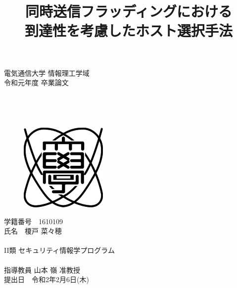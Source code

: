 \title{ 同時送信フラッディングにおける\\ 到達性を考慮したホスト選択手法}

\begin{titlepage}
\renewcommand{\baselinestretch}{1.5}
\begin{center}
{\Large
電気通信大学 情報理工学域 \\
令和元年度 卒業論文 \\
}
\end{center}
\renewcommand{\baselinestretch}{1.0}
{\LARGE
\begin{center}
\mbox{} \\
\end{center}
\mbox{} \\
\begin{figure}[h]
\begin{center}
\includegraphics[width=0.15 \linewidth,bb=0 0 160 160]{graphs/ueclogo.png}
\end{center}
\end{figure}

\renewcommand{\baselinestretch}{1.5}
\begin{center}
学籍番号　1610109 \\
氏名　榎戸 菜々穂 \\
\mbox{} \\
I\hspace{-.1em}I類 セキュリティ情報学プログラム\\
\mbox{} \\
指導教員    山本 嶺 准教授\\
提出日　令和2年2月6日(木)
\end{center}
}
\end{titlepage}
\renewcommand{\baselinestretch}{1.0}
